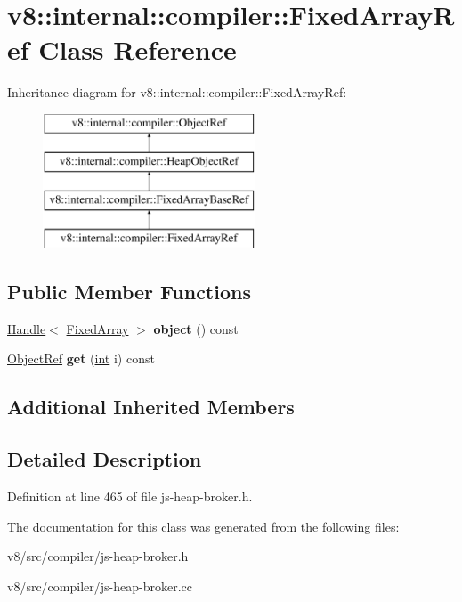 \hypertarget{classv8_1_1internal_1_1compiler_1_1FixedArrayRef}{}\section{v8\+:\+:internal\+:\+:compiler\+:\+:Fixed\+Array\+Ref Class Reference}
\label{classv8_1_1internal_1_1compiler_1_1FixedArrayRef}
Inheritance diagram for v8\+:\+:internal\+:\+:compiler\+:\+:Fixed\+Array\+Ref\+:\begin{figure}[H]
\begin{center}
\leavevmode
\includegraphics[height=4.000000cm]{classv8_1_1internal_1_1compiler_1_1FixedArrayRef}
\end{center}
\end{figure}
\subsection*{Public Member Functions}
\begin{DoxyCompactItemize}
\item 
\mbox{\label{classv8_1_1internal_1_1compiler_1_1FixedArrayRef_a56de2e210cee71b3ed681bcb6652ac1b}} 
\mbox{\hyperlink{classv8_1_1internal_1_1Handle}{Handle}}$<$ \mbox{\hyperlink{classv8_1_1internal_1_1FixedArray}{Fixed\+Array}} $>$ {\bfseries object} () const
\item 
\mbox{\label{classv8_1_1internal_1_1compiler_1_1FixedArrayRef_a10a4dcbd7c67f5b5cda20761882ff856}} 
\mbox{\hyperlink{classv8_1_1internal_1_1compiler_1_1ObjectRef}{Object\+Ref}} {\bfseries get} (\mbox{\hyperlink{classint}{int}} i) const
\end{DoxyCompactItemize}
\subsection*{Additional Inherited Members}


\subsection{Detailed Description}


Definition at line 465 of file js-\/heap-\/broker.\+h.



The documentation for this class was generated from the following files\+:\begin{DoxyCompactItemize}
\item 
v8/src/compiler/js-\/heap-\/broker.\+h\item 
v8/src/compiler/js-\/heap-\/broker.\+cc\end{DoxyCompactItemize}
